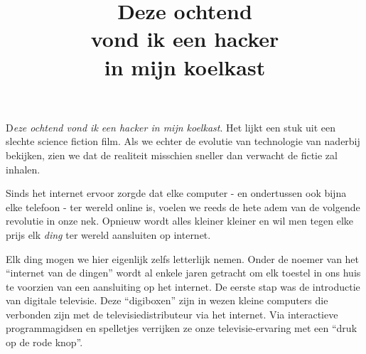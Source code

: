 \documentclass[DIV=calc,paper=a4,fontsize=11pt,twocolumn]{scrartcl}
\title{Deze ochtend\\vond ik een hacker\\in mijn koelkast}
\date{}
\newcommand{\initial}[1]{
\lettrine[lines=4,lhang=0.3,nindent=0em]{
\color{VeryDarkGrey}
{\textsf{#1}}}{}}
\begin{document}

\initial{D}\emph{eze ochtend vond ik een hacker in mijn koelkast}. Het lijkt
een stuk uit een slechte science fiction film. Als we echter de evolutie van
technologie van naderbij bekijken, zien we dat de realiteit misschien sneller
dan verwacht de fictie zal inhalen.

Sinds het internet ervoor zorgde dat elke computer - en ondertussen ook bijna
elke telefoon - ter wereld online is, voelen we reeds de hete adem van de
volgende revolutie in onze nek. Opnieuw wordt alles kleiner kleiner en wil men
tegen elke prijs elk \emph{ding} ter wereld aansluiten op internet.

Elk ding mogen we hier eigenlijk zelfs letterlijk nemen. Onder de noemer van
het ``internet van de dingen'' wordt al enkele jaren getracht om elk toestel in
ons huis te voorzien van een aansluiting op het internet. De eerste stap was de
introductie van digitale televisie. Deze ``digiboxen'' zijn in wezen kleine
computers die verbonden zijn met de televisiedistributeur via het internet. Via
interactieve programmagidsen en spelletjes verrijken ze onze televisie-ervaring
met een ``druk op de rode knop''.
\end{document}

